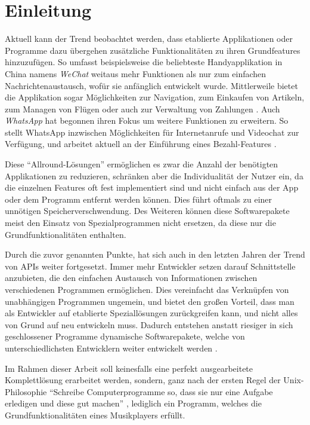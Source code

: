 
\chapter{Einleitung}
Aktuell kann der Trend beobachtet werden, dass etablierte Applikationen oder
Programme dazu übergehen zusätzliche Funktionalitäten zu ihren Grundfeatures
hinzuzufügen. So umfasst beispielsweise die beliebteste Handyapplikation in China namens
\textit{WeChat} weitaus mehr Funktionen als nur zum einfachen
Nachrichtenaustausch, wofür sie anfänglich entwickelt wurde. Mittlerweile
bietet die Applikation sogar Möglichkeiten zur Navigation, zum
Einkaufen von Artikeln, zum Managen von Flügen oder auch zur Verwaltung von
Zahlungen \autocite{was_ist_wechat?_2019}. Auch \textit{WhatsApp} hat begonnen ihren
Fokus um weitere Funktionen zu erweitern. So stellt WhatsApp inzwischen
Möglichkeiten für Internetanrufe und Videochat zur Verfügung, und arbeitet
aktuell an der Einführung eines Bezahl-Features \autocite{shead_2019}. \hfill


Diese \enquote{Allround-Lösungen} \space ermöglichen es zwar die Anzahl der
benötigten Applikationen zu reduzieren, schränken aber die Individualität der
Nutzer ein, da die einzelnen Features oft fest implementiert sind und nicht
einfach aus der App oder dem Programm entfernt werden können. Dies führt
oftmals zu einer unnötigen Speicherverschwendung. Des Weiteren können diese
Softwarepakete meist den Einsatz von Spezialprogrammen nicht ersetzen, da diese
nur die Grundfunktionalitäten enthalten. \hfill


Durch die zuvor genannten Punkte, hat sich auch in den letzten Jahren der Trend
von \acp{API} weiter fortgesetzt. Immer mehr Entwickler setzen darauf
Schnittstelle anzubieten, die den einfachen Austausch von Informationen zwischen verschiedenen
Programmen ermöglichen. Dies vereinfacht das Verknüpfen von unabhängigen
Programmen ungemein, und bietet den großen Vorteil, dass man als Entwickler auf
etablierte Speziallösungen zurückgreifen kann, und nicht alles von Grund auf
neu entwickeln muss. Dadurch entstehen anstatt riesiger in sich geschlossener Programme
dynamische Softwarepakete, welche von unterschiedlichsten Entwicklern weiter
entwickelt werden \autocite{babati_2018} \autocite{sandoval_2018}. \hfill \break

Im Rahmen dieser Arbeit soll keinesfalls eine perfekt ausgearbeitete
Komplettlösung erarbeitet werden, sondern, ganz nach der ersten Regel der
Unix-Philosophie \enquote{Schreibe Computerprogramme so, dass sie nur eine
Aufgabe erledigen und diese gut machen} \autocite{gancarz_1997}, lediglich ein
Programm, welches die Grundfunktionalitäten eines Musikplayers erfüllt.


